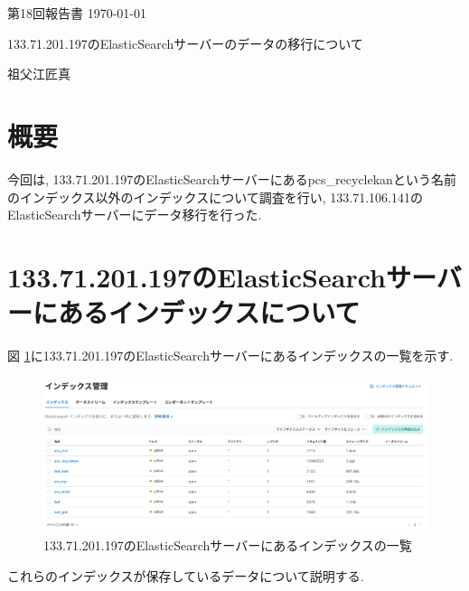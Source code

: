 \documentclass[a4j,12pt,]{jarticle}
\begin{document}
{\noindent\small 第18回報告書 \hfill\today}
\begin{center}
  {\Large 133.71.201.197のElasticSearchサーバーのデータの移行について}
\end{center}
\begin{flushright}
  祖父江匠真 \\
\end{flushright}

\section{概要}
今回は, 133.71.201.197のElasticSearchサーバーにあるpcs\_recyclekanという名前のインデックス以外のインデックスについて調査を行い, 133.71.106.141のElasticSearchサーバーにデータ移行を行った.

\section{133.71.201.197のElasticSearchサーバーにあるインデックスについて}
図 \ref{p1}に133.71.201.197のElasticSearchサーバーにあるインデックスの一覧を示す.

\begin{figure}[H]
  \begin{center}
    \includegraphics[width=160mm]{indexes.png}
    \caption{133.71.201.197のElasticSearchサーバーにあるインデックスの一覧}
    \label{p1}
  \end{center}
\end{figure}

これらのインデックスが保存しているデータについて説明する.
\end{document}
